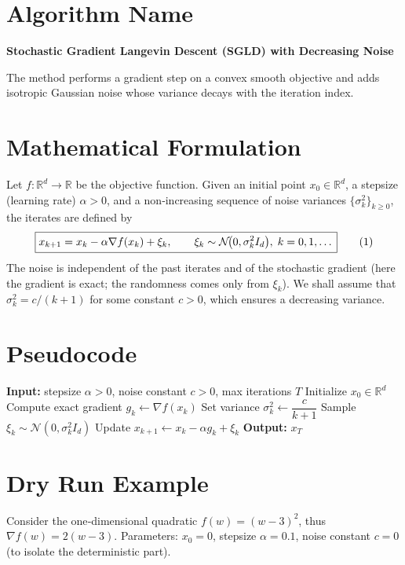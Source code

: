 \documentclass{article}
\newcommand{\R}{\mathbb{R}}
\begin{document}
\section*{Algorithm Name}
\textbf{Stochastic Gradient Langevin Descent (SGLD) with Decreasing Noise}  

The method performs a gradient step on a convex smooth objective and adds isotropic Gaussian noise whose variance decays with the iteration index.

\section*{Mathematical Formulation}
Let $f:\R^{d}\to\R$ be the objective function.  
Given an initial point $x_{0}\in\R^{d}$, a stepsize (learning rate) $\alpha>0$, and a non‑increasing sequence of noise variances $\{\sigma_{k}^{2}\}_{k\ge 0}$, the iterates are defined by
\[
\boxed{%
x_{k+1}=x_{k}-\alpha \nabla f(x_{k})+\xi_{k},\qquad 
\xi_{k}\sim\mathcal N\!\bigl(0,\sigma_{k}^{2}I_{d}\bigr),\;k=0,1,\dots
}
\tag{1}
\]
The noise is independent of the past iterates and of the stochastic gradient (here the gradient is exact; the randomness comes only from $\xi_k$).  
We shall assume that $\sigma_{k}^{2}=c/(k+1)$ for some constant $c>0$, which ensures a decreasing variance.

\section*{Pseudocode}
\begin{algorithm}[H]
\caption{SGLD with Decreasing Noise}
\begin{algorithmic}[1]
\State \textbf{Input:} stepsize $\alpha>0$, noise constant $c>0$, max iterations $T$
\State Initialize $x_{0}\in\R^{d}$
    \State Compute exact gradient $g_{k}\gets \nabla f(x_{k})$
    \State Set variance $\sigma_{k}^{2}\gets \dfrac{c}{k+1}$
    \State Sample $\xi_{k}\sim\mathcal N(0,\sigma_{k}^{2}I_{d})$
    \State Update $x_{k+1}\gets x_{k}-\alpha g_{k}+\xi_{k}$
\EndFor
\State \textbf{Output:} $x_{T}$
\end{algorithmic}
\end{algorithm}

\section*{Dry Run Example}
Consider the one‑dimensional quadratic $f(w)=(w-3)^{2}$, thus $\nabla f(w)=2(w-3)$.  
Parameters: $x_{0}=0$, stepsize $\alpha=0.1$, noise constant $c=0$ (to isolate the deterministic part).  
\end{document}
